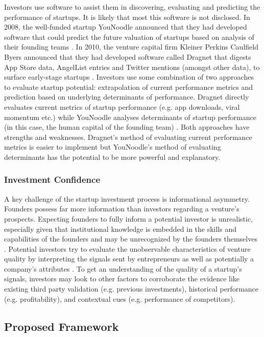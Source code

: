 \documentclass[../thesis/thesis.tex]{subfiles}
\begin{document}
Investors use software to assist them in discovering, evaluating and predicting the performance of startups. It is likely that most this software is not disclosed. In 2008, the well-funded startup YouNoodle announced that they had developed software that could predict the future valuation of startups based on analysis of their founding teams \cite{arrington2008}. In 2010, the venture capital firm Kleiner Perkins Caulfield Byers announced that they had developed software called Dragnet that digests App Store data, AngelList entries and Twitter mentions (amongst other data), to surface early-stage startups \cite{geron2013}. Investors use some combination of two approaches to evaluate startup potential: extrapolation of current performance metrics and prediction based on underlying determinants of performance. Dragnet directly evaluates current metrics of startup performance (e.g. app downloads, viral momentum etc.) \cite{geron2013} while YouNoodle analyses determinants of startup performance (in this case, the human capital of the founding team) \cite{arrington2008}. Both approaches have strengths and weaknesses. Dragnet's method of evaluating current performance metrics is easier to implement but YouNoodle's method of evaluating determinants has the potential to be more powerful and explanatory.

\subsubsection{Investment Confidence}

A key challenge of the startup investment process is informational asymmetry. Founders possess far more information than investors regarding a venture's prospects. Expecting founders to fully inform a potential investor is unrealistic, especially given that institutional knowledge is embedded in the skills and capabilities of the founders and may be unrecognized by the founders themselves \cite{barney1991}. Potential investors try to evaluate the unobservable characteristics of venture quality by interpreting the signals sent by entrepreneurs as well as potentially a company's attributes \cite{connelly2011}. To get an understanding of the quality of a startup's signals, investors may look to other factors to corroborate the evidence like existing third party validation (e.g. previous investments), historical performance (e.g. profitability), and contextual cues (e.g. performance of competitors).

\subsection{Proposed Framework}
\end{document}
